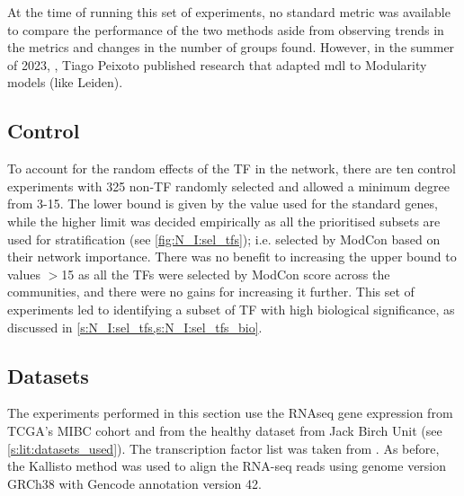 At the time of running this set of experiments, no standard metric was available to compare the performance of the two methods aside from observing trends in the metrics and changes in the number of groups found. However, in the summer of 2023, \cite{Peixoto2023-se}, Tiago Peixoto published research that adapted \acrshort{mdl} to Modularity models (like Leiden).

\subsection*{Control}

To account for the random effects of the TF in the network, there are ten control experiments with 325 non-TF randomly selected and allowed a minimum degree from 3-15. The lower bound is given by the value used for the standard genes, while the higher limit was decided empirically as all the prioritised subsets are used for stratification (see \cref{fig:N_I:sel_tfs}); i.e. selected by ModCon based on their network importance. There was no benefit to increasing the upper bound to values $>$15 as all the TFs were selected by ModCon score across the communities, and there were no gains for increasing it further. This set of experiments led to identifying a subset of TF with high biological significance, as discussed in \cref{s:N_I:sel_tfs,s:N_I:sel_tfs_bio}.

\subsection*{Datasets}

The experiments performed in this section use the RNAseq gene expression from TCGA's MIBC cohort and from the healthy dataset from Jack Birch Unit (see \cref{s:lit:datasets_used}). The transcription factor list was taken from \citet{Lambert2018-el}. As before, the Kallisto method was used to align the RNA-seq reads using genome version GRCh38 with Gencode annotation version 42. 


